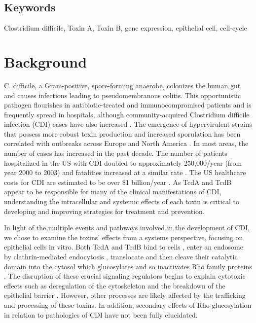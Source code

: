 \subsection{Keywords}
Clostridium difficile, Toxin A, Toxin B, gene expression, epithelial cell, cell-cycle

\section{Background}
C. difficile, a Gram-positive, spore-forming anaerobe, colonizes the human gut and causes infections leading to pseudomembranous colitis.  This opportunistic pathogen flourishes in antibiotic-treated and immunocompromised patients and is frequently spread in hospitals, although community-acquired Clostridium difficile infection (CDI) cases have also increased \cite{Freeman:2010bv}. The emergence of hypervirulent strains that possess more robust toxin production and increased sporulation has been correlated with outbreaks across Europe and North America \cite{Warny:2005kd}. In most areas, the number of cases has increased in the past decade. The number of patients hospitalized in the US with CDI doubled to approximately 250,000/year (from year 2000 to 2003) and fatalities increased at a similar rate \cite{Zilberberg:2008gd}. The US healthcare costs for CDI are estimated to be over \$1 billion/year \cite{Dubberke:2009ic}. As TcdA and TcdB appear to be responsible for many of the clinical manifestations of CDI, understanding the intracellular and systemic effects of each toxin is critical to developing and improving strategies for treatment and prevention.

In light of the multiple events and pathways involved in the development of CDI, we chose to examine the toxins’ effects from a systems perspective, focusing on epithelial cells in vitro. Both TcdA and TcdB bind to cells \cite{Frisch:2003jo}, enter an endosome by clathrin-mediated endocytosis \cite{Papatheodorou:2010io}, translocate and then cleave their catalytic domain into the cytosol which glucosylates and so inactivates Rho family proteins \cite{Egerer:2007fy}. The disruption of these crucial signaling regulators begins to explain cytotoxic effects such as deregulation of the cytoskeleton and the breakdown of the epithelial barrier \cite{Nusrat:2001cs}. However, other processes are likely affected by the trafficking and processing of these toxins. In addition, secondary effects of Rho glucosylation in relation to pathologies of CDI have not been fully elucidated.


